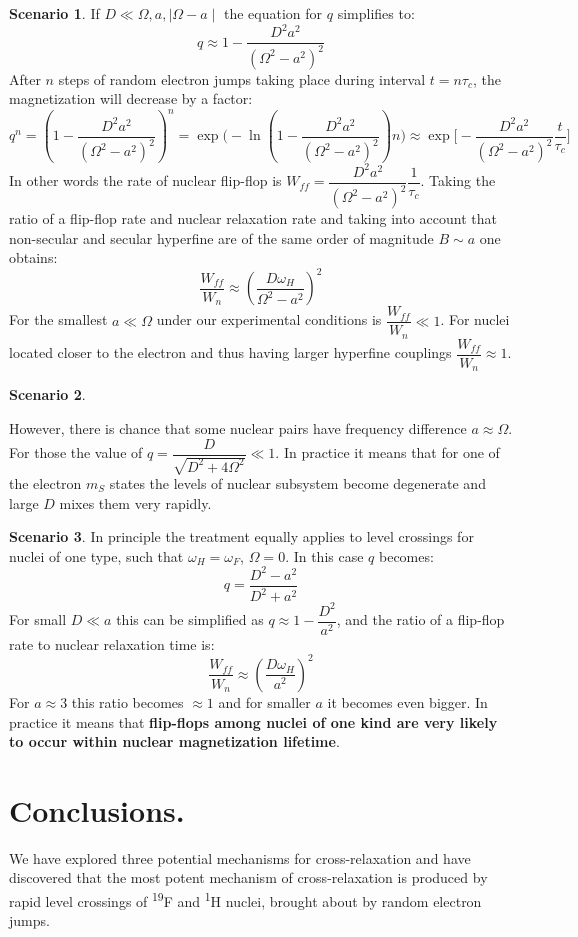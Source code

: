 \documentclass[a4paper, 12pt]{article}
\begin{document}
\textbf{Scenario 1}.
If $D \ll \Omega, a, \mid \Omega - a \mid  $ the equation for $q$ simplifies to:
\begin{equation}
  q \approx 1 - \dfrac{D^2 a^2}{(\Omega^2 - a^2)^2}
\end{equation}
 After $n$ steps of random electron jumps taking place during interval $t =  n \tau_c $, the magnetization will decrease by a factor:
 \begin{equation}
    q^n = (1 - \dfrac{D^2 a^2}{(\Omega^2 - a^2)^2} )^n  = \exp \Big(-\ln (1 - \dfrac{D^2 a^2}{(\Omega^2 - a^2)^2}) n \Big) \approx \exp \Big[-\dfrac{D^2 a^2}{(\Omega^2 - a^2)^2} \dfrac{t}{ \tau_c} \Big]
 \end{equation}
 In other words the rate of nuclear flip-flop is $W_{ff} = \dfrac{D^2 a^2}{(\Omega^2 - a^2)^2} \dfrac{1}{ \tau_c} $. Taking the ratio of a flip-flop rate and nuclear relaxation rate and taking into account that non-secular and secular hyperfine are of the same order of magnitude  $B  \sim a$ one obtains:
 \begin{equation}
    \dfrac{W_{ff}}{W_n} \approx ( \dfrac{D \omega_H}{\Omega^2 - a^2} )^2
 \end{equation}
 For the smallest $a \ll \Omega$ under our experimental conditions is $ \dfrac{W_{ff}}{W_n} \ll 1$. For nuclei located closer to the electron and thus having larger hyperfine couplings $ \dfrac{W_{ff}}{W_n} \approx 1$. 
 
\textbf{Scenario 2}.

However, there is chance that some nuclear pairs have frequency difference  $a \approx \Omega$. For those the value of $q = \dfrac{D}{\sqrt{D^2 + 4 \Omega ^2}} \ll 1$. In practice it means that for one of the electron $m_S$ states the levels of nuclear subsystem become degenerate and large $D$ mixes them very rapidly.

\textbf{Scenario 3}.
In principle the treatment equally applies to level crossings for nuclei of one type, such that $\omega_H = \omega_F$, $\Omega = 0$. In this case $q$  becomes:
\begin{equation}
  q = \dfrac{D^2 - a^2 }{D^2 + a^2}
\end{equation}
For small $D \ll a$ this can be simplified as $q \approx 1 - \dfrac{D^2}{a^2}$, and the ratio of a flip-flop rate to nuclear relaxation time is:
\begin{equation}
    \dfrac{W_{ff}}{W_n} \approx ( \dfrac{D \omega_H}{a^2} )^2
\end{equation}
For $a \approx 3$ this ratio becomes $\approx 1$ and for smaller $a$ it becomes even bigger. In practice it means that \textbf{flip-flops among nuclei of one kind are very likely to occur within nuclear magnetization lifetime}.





\section{Conclusions.}

We have explored three potential mechanisms for cross-relaxation and have discovered that the most potent mechanism of cross-relaxation is produced by rapid level crossings of \textsuperscript{19}F and \textsuperscript{1}H nuclei, brought about by random electron jumps. 

  
\end{document}
